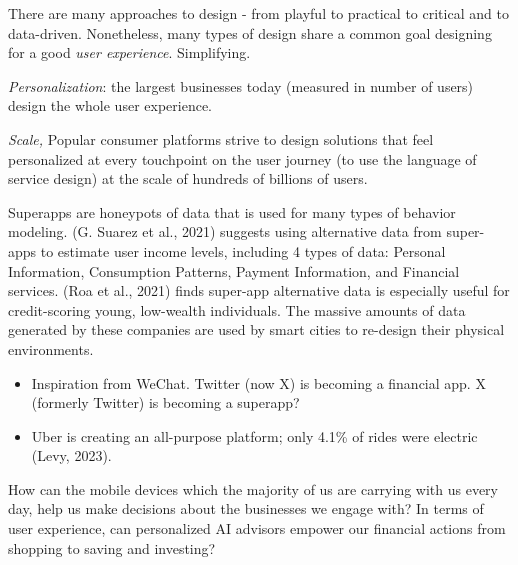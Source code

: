 \documentclass[
  letterpaper,
  DIV=11,
  numbers=noendperiod]{scrartcl}
\begin{document}
There are many approaches to design - from playful to practical to
critical and to data-driven. Nonetheless, many types of design share a
common goal designing for a good \emph{user experience}. Simplifying.

\emph{Personalization}: the largest businesses today (measured in number
of users) design the whole user experience.

\emph{Scale,} Popular consumer platforms strive to design solutions that
feel personalized at every touchpoint on the user journey (to use the
language of service design) at the scale of hundreds of billions of
users.

Superapps are honeypots of data that is used for many types of behavior
modeling. (G. Suarez et al., 2021) suggests using alternative data from
super-apps to estimate user income levels, including 4 types of data:
Personal Information, Consumption Patterns, Payment Information, and
Financial services. (Roa et al., 2021) finds super-app alternative data
is especially useful for credit-scoring young, low-wealth individuals.
The massive amounts of data generated by these companies are used by
smart cities to re-design their physical environments.

\begin{itemize}
\item
  Inspiration from WeChat. Twitter (now X) is becoming a financial app.
  X (formerly Twitter) is becoming a superapp?
\item
  Uber is creating an all-purpose platform; only 4.1\% of rides were
  electric (Levy, 2023).
\end{itemize}

How can the mobile devices which the majority of us are carrying with us
every day, help us make decisions about the businesses we engage with?
In terms of user experience, can personalized AI advisors empower our
financial actions from shopping to saving and investing?
\end{document}
